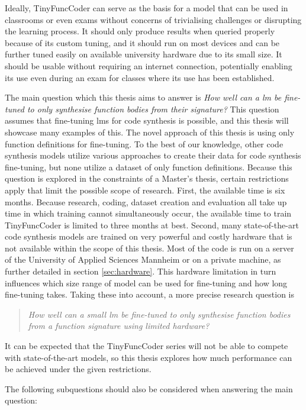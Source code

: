 Ideally, TinyFuncCoder can serve as the basis for a model that can be used in classrooms or even exams without concerns of trivialising challenges or disrupting the learning process.
It should only produce results when queried properly because of its custom tuning, and it should run on most devices and can be further tuned easily on available university hardware due to its small size.
It should be usable without requiring an internet connection, potentially enabling its use even during an exam for classes where its use has been established.

The main question which this thesis aims to answer is \emph{How well can a \acl{lm} be fine-tuned to only synthesise function bodies from their signature?}
This question assumes that fine-tuning \acp{lm} for code synthesis is possible, and this thesis will showcase many examples of this.
The novel approach of this thesis is using only function definitions for fine-tuning.
To the best of our knowledge, other code synthesis models utilize various approaches to create their data for code synthesis fine-tuning, but none utilize a dataset of only function definitions.
Because this question is explored in the constraints of a Master's thesis, certain restrictions apply that limit the possible scope of research.
First, the available time is six months.
Because research, coding, dataset creation and evaluation all take up time in which training cannot simultaneously occur, the available time to train TinyFuncCoder is limited to three months at best.
Second, many state-of-the-art code synthesis models are trained on very powerful and costly hardware that is not available within the scope of this thesis.
Most of the code is run on a server of the University of Applied Sciences Mannheim or on a private machine, as further detailed in section \ref{sec:hardware}.
This hardware limitation in turn influences which size range of model can be used for fine-tuning and how long fine-tuning takes.
Taking these into account, a more precise research question is
\begin{quote}
\emph{How well can a small \acl{lm} be fine-tuned to only synthesise function bodies from a function signature using limited hardware?}
\end{quote}
It can be expected that the TinyFuncCoder series will not be able to compete with state-of-the-art models, so this thesis explores how much performance can be achieved under the given restrictions.

The following subquestions should also be considered when answering the main question:

